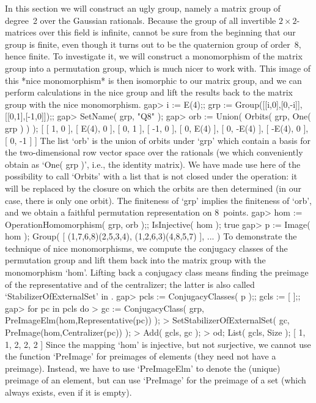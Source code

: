 
In this section we will construct an ugly group, namely a matrix group of
degree~2 over the Gaussian rationals. Because the group of all invertible
$2\times 2$-matrices over this  field is infinite,  {\GAP} cannot be sure
from the beginning that our group is finite, even though  it turns out to
be the quaternion  group of order~8, hence  finite. To investigate it, we
will construct  a  monomorphism of  the matrix  group into a  permutation
group, which  is much   nicer  to work with.  This   image of this  *nice
monomorphism* is then isomorphic to our  matrix group, and we can perform
calculations in the nice  group and lift the  results back to the  matrix
group with the nice monomorphism.
\beginexample
    gap> i := E(4);; grp := Group([[i,0],[0,-i]],[[0,1],[-1,0]]);;
    gap> SetName( grp, "Q8" );
    gap> orb := Union( Orbits( grp, One( grp ) ) );
    [ [ 1, 0 ], [ E(4), 0 ], [ 0, 1 ], [ -1, 0 ], [ 0, E(4) ], [ 0, -E(4) ], 
        [ -E(4), 0 ], [ 0, -1 ] ]
\endexample
The list `orb' is the  union of orbits under `grp'  which contain a basis
for the  two-dimensional row  vector space over   the rationals (we which
conveniently obtain as `One( grp )',  i.e., the identity matrix). We have
made use here of the possibility to call `Orbits' with a list that is not
closed under the operation:  it will be replaced by  the closure on which
the orbits  are then determined (in our  case, there  is only one orbit).
The finiteness of `grp' implies the finiteness of `orb',  and we obtain a
faithful permutation representation on 8~points.
\beginexample
    gap> hom := OperationHomomorphism( grp, orb );; IsInjective( hom );
    true
    gap> p := Image( hom );
    Group( [ (1,7,6,8)(2,5,3,4), (1,2,6,3)(4,8,5,7) ], ... )
\endexample
To   demonstrate  the technique of  nice    monomorphisms, we compute the
conjugacy classes of  the permutation group and  lift them back  into the
matrix group with the monomorphism `hom'.  Lifting back a conjugacy class
means finding the preimage of  the representative and of the centralizer;
the latter is also called `StabilizerOfExternalSet' in {\GAP}.
\beginexample
    gap> pcls := ConjugacyClasses( p );; gcls := [  ];;
    gap> for pc  in pcls  do
    >      gc := ConjugacyClass( grp, PreImageElm(hom,Representative(pc)) );
    >      SetStabilizerOfExternalSet( gc, PreImage(hom,Centralizer(pc)) );
    >      Add( gcls, gc );
    >    od; List( gcls, Size );
    [ 1, 1, 2, 2, 2 ]
\endexample
Since the  mapping `hom' is injective, but  not surjective, we cannot use
the function `PreImage' for  preimages of elements  (they need not have a
preimage). Instead,  we have to use `PreImageElm'  to denote the (unique)
preimage of an element, but can use `PreImage'  for the preimage of a set
(which always exists, even if it is empty).

